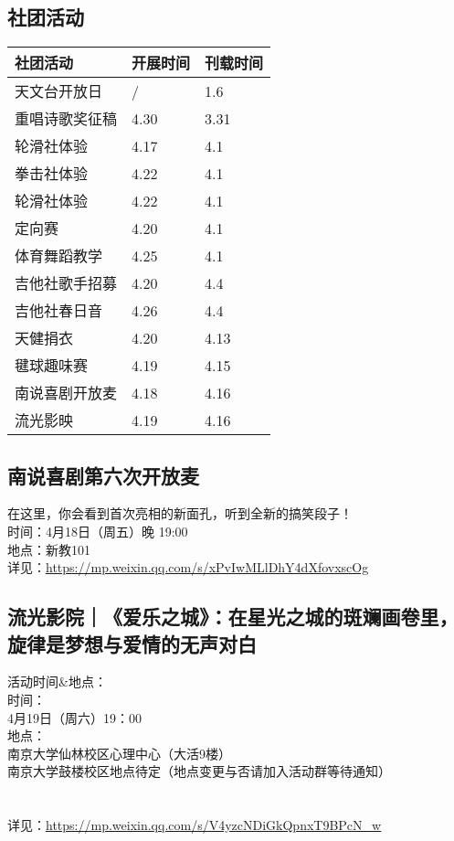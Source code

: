 \documentclass[letterpaper, 12pt]{article}
\begin{document}
\begin{multicols}{2}
\section{社团活动}
\begin{tabular}{|>{\centering\arraybackslash}m{}|m{}|m{}|}
    \hline
    社团活动 & 开展时间 & 刊载时间\\
    \hline\hline
    天文台开放日 & / & 1.6\\
    重唱诗歌奖征稿 & 4.30 & 3.31\\
    轮滑社体验 & 4.17 & 4.1\\
    拳击社体验 & 4.22 & 4.1\\
    轮滑社体验 & 4.22 & 4.1\\
    定向赛 & 4.20 & 4.1\\
    体育舞蹈教学 & 4.25 & 4.1\\
    吉他社歌手招募 & 4.20 & 4.4\\
    吉他社春日音 & 4.26 & 4.4\\
    天健捐衣 & 4.20 & 4.13\\
    毽球趣味赛 & 4.19 & 4.15\\
    南说喜剧开放麦 & 4.18 & 4.16\\
    流光影映 & 4.19 & 4.16\\
    \hline
\end{tabular}
\subsection{南说喜剧第六次开放麦}
在这里，你会看到首次亮相的新面孔，听到全新的搞笑段子！
\\时间：4月18日（周五）晚 19:00
\\地点：新教101
\\详见：\url{https://mp.weixin.qq.com/s/xPvIwMLlDhY4dXfovxscOg}

\subsection{流光影院｜《爱乐之城》：在星光之城的斑斓画卷里，旋律是梦想与爱情的无声对白}
活动时间\&地点：
\\时间：
\\4月19日（周六）19：00
\\地点：
\\南京大学仙林校区心理中心（大活9楼）
\\南京大学鼓楼校区地点待定（地点变更与否请加入活动群等待通知）
\\
\\
\\详见：\url{https://mp.weixin.qq.com/s/V4yzcNDiGkQpnxT9BPcN_w}
\end{multicols}
\end{document}
